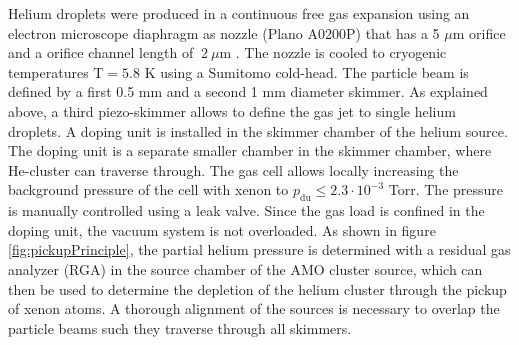 Helium droplets were produced in a continuous free gas expansion using an electron microscope diaphragm as nozzle (Plano A0200P) that has a 5 $\mu$m orifice and a orifice channel length of $~2\ \mu$m  \citep{Gomez-2011-JCP}. The nozzle is cooled to cryogenic temperatures $\text{T}= 5.8$ K using a Sumitomo cold-head. The particle beam is defined by a first 0.5 mm and a second 1 mm diameter skimmer. As explained above, a third piezo-skimmer allows to define the gas jet to single helium droplets. A doping unit is installed in the skimmer chamber of the helium source. The doping unit is a separate smaller chamber in the skimmer chamber, where He-cluster can traverse through. The gas cell allows locally increasing the background pressure of the cell with xenon to $p_{\text{du}}\leq 2.3\cdot 10^{-3}$ Torr. The pressure is manually controlled using a leak valve. Since the gas load is confined in the doping unit, the vacuum system is not overloaded. As shown in figure \ref{fig:pickupPrinciple}, the partial helium pressure is determined with a residual gas analyzer (RGA) in the source chamber of the AMO cluster source, which can then be used to determine the depletion of the helium cluster through the pickup of xenon atoms. A thorough alignment of the sources is necessary to overlap the particle beams such they traverse through all skimmers.%
%
%
%
